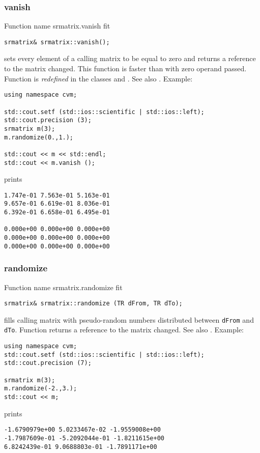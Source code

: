 \subsubsection{vanish}
Function%
\pdfdest name {srmatrix.vanish} fit
\begin{verbatim}
srmatrix& srmatrix::vanish();
\end{verbatim}
sets every element of a calling matrix to be equal to zero
and returns a reference to
the matrix changed. This function is faster
than
with zero operand passed.
Function is \emph{redefined} in the classes
 and
.
See also .
Example:
\begin{Verbatim}
using namespace cvm;

std::cout.setf (std::ios::scientific | std::ios::left); 
std::cout.precision (3);
srmatrix m(3);
m.randomize(0.,1.);

std::cout << m << std::endl;
std::cout << m.vanish ();
\end{Verbatim}
prints
\begin{Verbatim}
1.747e-01 7.563e-01 5.163e-01
9.657e-01 6.619e-01 8.036e-01
6.392e-01 6.658e-01 6.495e-01

0.000e+00 0.000e+00 0.000e+00
0.000e+00 0.000e+00 0.000e+00
0.000e+00 0.000e+00 0.000e+00
\end{Verbatim}
\newpage




\subsubsection{randomize}
Function%
\pdfdest name {srmatrix.randomize} fit
\begin{verbatim}
srmatrix& srmatrix::randomize (TR dFrom, TR dTo);
\end{verbatim}
fills  calling matrix with pseudo-random numbers distributed between
\verb"dFrom" and \verb"dTo".
Function
returns a reference to the matrix changed.
See also
.
Example:
\begin{Verbatim}
using namespace cvm;
std::cout.setf (std::ios::scientific | std::ios::left); 
std::cout.precision (7);

srmatrix m(3);
m.randomize(-2.,3.);
std::cout << m;
\end{Verbatim}
prints
\begin{Verbatim}
-1.6790979e+00 5.0233467e-02 -1.9559008e+00
-1.7987609e-01 -5.2092044e-01 -1.8211615e+00
6.8242439e-01 9.0688803e-01 -1.7891171e+00
\end{Verbatim}
\newpage

